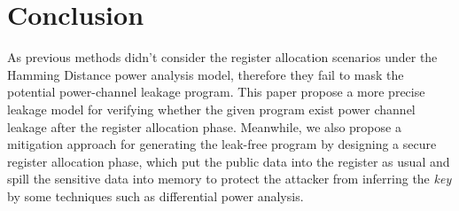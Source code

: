 \documentclass[10pt, conference]{IEEEtran}
\begin{document}
\section{Conclusion}
As previous methods didn't consider the register allocation scenarios under the Hamming Distance power analysis model, therefore they fail to mask the potential power-channel leakage program. This paper propose a more precise leakage model for verifying whether the given program exist power channel leakage after the register allocation phase. Meanwhile, we also propose a mitigation approach for generating the leak-free program by designing a secure register allocation phase, which put the public data into the register as usual and spill the sensitive data into memory to protect the attacker from inferring the \emph{key} by some techniques such as differential power analysis.
\begin{table}[]
\end{table}



\end{document}
